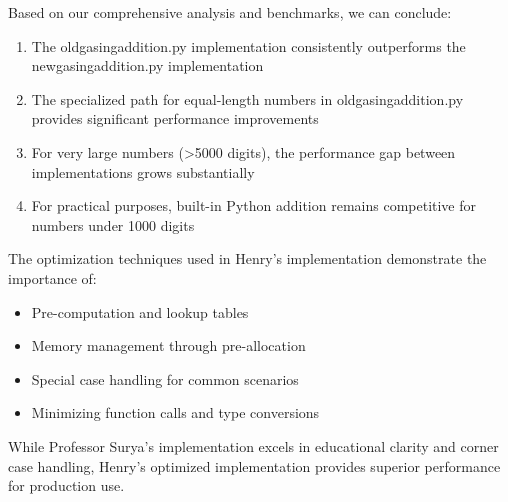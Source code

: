 \documentclass{article}
\begin{document}
Based on our comprehensive analysis and benchmarks, we can conclude:

\begin{enumerate}
    \item The oldgasingaddition.py implementation consistently outperforms the newgasingaddition.py implementation
    \item The specialized path for equal-length numbers in oldgasingaddition.py provides significant performance improvements
    \item For very large numbers (>5000 digits), the performance gap between implementations grows substantially
    \item For practical purposes, built-in Python addition remains competitive for numbers under 1000 digits
\end{enumerate}

The optimization techniques used in Henry's implementation demonstrate the importance of:
\begin{itemize}
    \item Pre-computation and lookup tables
    \item Memory management through pre-allocation
    \item Special case handling for common scenarios
    \item Minimizing function calls and type conversions
\end{itemize}

While Professor Surya's implementation excels in educational clarity and corner case handling, Henry's optimized implementation provides superior performance for production use.
\end{document}
